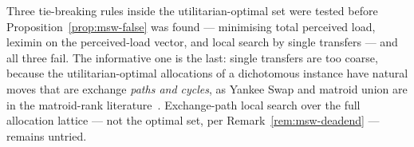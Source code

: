 Three tie-breaking rules inside the utilitarian-optimal set were tested before
Proposition~\ref{prop:msw-false} was found --- minimising total perceived load,
leximin on the perceived-load vector, and local search by single transfers --- and
all three fail. The informative one is the last: single transfers are too coarse,
because the utilitarian-optimal allocations of a dichotomous instance have
natural moves that are exchange \emph{paths and cycles}, as Yankee Swap and
matroid union are in the matroid-rank literature~\cite{BEF21}. Exchange-path local
search over the full allocation lattice --- not the optimal set, per
Remark~\ref{rem:msw-deadend} --- remains untried.
